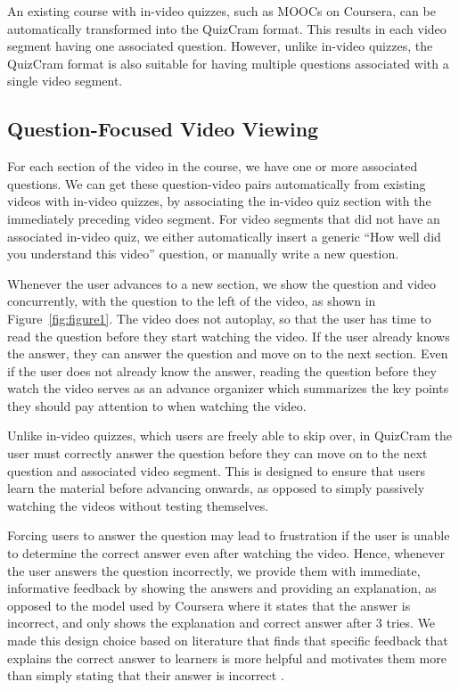 \documentclass{chi-ext}
\begin{document}
An existing course with in-video quizzes, such as MOOCs on Coursera, can be automatically transformed into the QuizCram format. This results in each video segment having one associated question. However, unlike in-video quizzes, the QuizCram format is also suitable for having multiple questions associated with a single video segment.


\subsection{Question-Focused Video Viewing}
For each section of the video in the course, we have one or more associated questions. We can get these question-video pairs automatically from existing videos with in-video quizzes, by associating the in-video quiz section with the immediately preceding video segment. For video segments that did not have an associated in-video quiz, we either automatically insert a generic ``How well did you understand this video'' question, or manually write a new question.

Whenever the user advances to a new section, we show the question and video concurrently, with the question to the left of the video, as shown in Figure~\ref{fig:figure1}. The video does not autoplay, so that the user has time to read the question before they start watching the video. If the user already knows the answer, they can answer the question and move on to the next section. Even if the user does not already know the answer, reading the question before they watch the video serves as an advance organizer which summarizes the key points they should pay attention to when watching the video.

Unlike in-video quizzes, which users are freely able to skip over, in QuizCram the user must correctly answer the question before they can move on to the next question and associated video segment. This is designed to ensure that users learn the material before advancing onwards, as opposed to simply passively watching the videos without testing themselves.

Forcing users to answer the question may lead to frustration if the user is unable to determine the correct answer even after watching the video. Hence, whenever the user answers the question incorrectly, we provide them with immediate, informative feedback by showing the answers and providing an explanation, as opposed to the model used by Coursera where it states that the answer is incorrect, and only shows the explanation and correct answer after 3 tries. We made this design choice based on literature that finds that specific feedback that explains the correct answer to learners is more helpful and motivates them more than simply stating that their answer is incorrect \cite{formativefeedback}.
\end{document}
